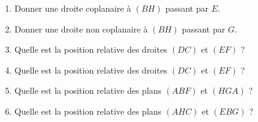 
\begin{exercice}\label{exosmath-0079}

    \begin{multicols}{2}
        \begin{enumerate}
            \item
        Donner une droite coplanaire à \( (BH)\) passant par \( E\).
    \item
        Donner une droite non coplanaire à \( (BH)\) passant par \( G\).
    \item
        Quelle est la position relative des droites \( (DC)\) et \( (EF)\) ?
    \item
        Quelle est la position relative des droites \( (DC)\) et \( (EF)\) ?
    \item
        Quelle est la position relative des plans \( (ABF)\) et \( (HGA)\) ?
    \item
        Quelle est la position relative des plans \( (AHC)\) et \( (EBG)\) ?
                
        \end{enumerate}
        \columnbreak
        \begin{center}

        \end{center}
    \end{multicols}

\end{exercice}

